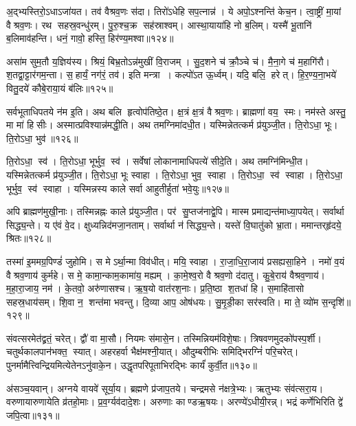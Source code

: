 अ॒द्भ्यस्तिरो॒ऽधाऽजा॑यत। तव॑ वैश्रव॒णः स॑दा। 
तिरो॑ऽधेहि सप॒त्नान्न॑। ये अपो॒ऽश्नन्ति॑ केच॒न। 
त्वा॒ष्ट्रीं मा॒यां वैश्रव॒णः। रथ सहस्र॒वन्धु॑रम्‌। 
पु॒रु॒श्च॒क्र सह॑स्राश्वम्‌। आस्था॒याया॑हि नो ब॒लिम्‌। 
यस्मै॑ भू॒तानि॑ ब॒लिमाव॑हन्ति। धनं॒ गावो॒ हस्ति॒ हिर॑ण्य॒मश्वा\sn{}॥१२४॥


असा॑म सुम॒तौ य॒ज्ञिय॑स्य। श्रियं॒ बिभ्र॒तोऽन्न॑मुखीं वि॒राजम्‌। 
सु॒द॒\ar{}शने च॑ क्रौ॒ञ्चे च॑। मै॒ना॒गे च॑ म॒हागि॑रौ। 
श॒तद्वा॒ट्टार॑गम॒न्ता। स॒हार्यं॒ नग॑रं॒ तव॑। 
इति मन्त्रा। कल्पो॑ऽत ऊ॒र्ध्वम्‌। यदि॒ बलि॒ हरेत्‌। 
हि॒र॒ण्य॒ना॒भये॑ वितु॒दये॑ कौबे॒राया॒यं ब॑लिः॥१२५॥


सर्वभूताधिपतये न॑म इ॒ति। अथ बलि हृत्वोप॑तिष्ठे॒त। 
क्ष॒त्रं क्ष॒त्रं वैश्रव॒णः। ब्राह्मणा॑ वय॒ स्मः। 
नम॑स्ते अस्तु॒ मा मा॑ हिसीः। अस्मात्प्रविश्यान्न॑मद्धी॒ति। 
अथ तमग्निमा॑दधी॒त। यस्मिन्नेतत्कर्म प्र॑युञ्जी॒त। 
ति॒रोऽधा॒ भूः। ति॒रोऽधा॒ भुव॑॥१२६॥


ति॒रोऽधा॒ स्व॑। ति॒रोऽधा॒ भूर्भुव॒ स्व॑। 
सर्वेषां लोकानामाधिपत्ये॑ सीदे॒ति। अथ तमग्नि॑मिन्धी॒त। 
यस्मिन्नेतत्कर्म प्र॑युञ्जी॒त। ति॒रोऽधा॒ भूः स्वाहा। 
ति॒रोऽधा॒ भुव॒ स्वाहा। ति॒रोऽधा॒ स्व॑ स्वाहा। 
ति॒रोऽधा॒ भूर्भुव॒ स्व॑ स्वाहा। 
यस्मिन्नस्य काले सर्वा आहुतीर्\mbox{}हुता॑ भवे॒युः॥१२७॥


अपि ब्राह्मण॑मुखी॒नाः। तस्मिन्नह्नः काले प्र॑युञ्जी॒त। 
पर॑ सु॒प्तज॑नाद्वे॒पि। मास्म प्रमाद्यन्त॑माध्या॒पयेत्‌। 
सर्वार्था सिद्ध्य॒न्ते। य ए॑वं वे॒द। 
क्षुध्यन्निद॑मजा॒नताम्‌। सर्वार्था न॑ सिद्ध्य॒न्ते। 
यस्ते॑ वि॒घातु॑को भ्रा॒ता। ममान्तर्‌हृ॑दये॒ श्रितः॥१२८॥


तस्मा॑ इ॒ममग्र॒पिण्डं॑ जुहोमि। स मेऽर्था॒न्मा विव॑धीत्‌। 
मयि॒ स्वाहा। रा॒जा॒धि॒रा॒जाय॑ प्रसह्यसा॒हिने। 
नमो॑ व॒यं वैश्रव॒णाय॑ कुर्महे। स मे॒ कामा॒न्काम॒कामा॑य॒ मह्यम्‌। 
का॒मे॒श्व॒रो वैश्रव॒णो द॑दातु। कु॒बे॒राय॑ वैश्रव॒णाय॑। 
म॒हा॒रा॒जाय॒ नम॑। के॒तवो॒ अरु॑णासश्च। 
ऋ॒ष॒यो वात॑रश॒नाः। प्र॒ति॒ष्ठा श॒तधा॑ हि। 
स॒माहि॑तासो सहस्र॒धाय॑सम्‌। शि॒वा न॒ शन्त॑मा भवन्तु। 
दि॒व्या आप॒ ओष॑धयः। सु॒मृ॒डी॒का सर॑स्वति। 
मा ते॒ व्यो॑म स॒न्दृशि॑॥१२९॥\anuvakamend


संवत्सरमेत॑द्व्रतं॒ चरेत्‌। द्वौ॑ वा मा॒सौ। 
नियमः स॑मासे॒न। तस्मिन्नियम॑विशे॒षाः। 
त्रिषवणमुदको॑पस्प॒र्शी। चतुर्थकालपान॑भक्त॒ स्यात्‌। 
अहरहर्वा भैक्ष॑मश्नी॒यात्‌। औदुम्बरीभिः समिद्भिरग्निं॑ परि॒चरेत्‌। 
पुनर्मामैत्त्विन्द्रियमित्येतेनऽनु॑वाके॒न। उद्धृतपरिपूताभि\-रद्भिः कार्यं॑ कुर्वी॒त॥१३०॥


अ॑सञ्च॒यवान्‌। अग्नये वायवे॑ सूर्या॒य। 
ब्रह्मणे प्र॑जाप॒तये। चन्द्रमसे न॑क्षत्रे॒भ्यः। 
ऋतुभ्यः संव॑त्सरा॒य। वरुणायारुणायेति व्र॑तहो॒माः। 
प्र॒व॒र्ग्यव॑दादे॒शः। अरुणाः काण्डऋ॒षयः। 
अरण्ये॑ऽधीयी॒रन्न्‌। भद्रं कर्णेभिरिति द्वे॑ जपि॒त्वा॥१३१॥


